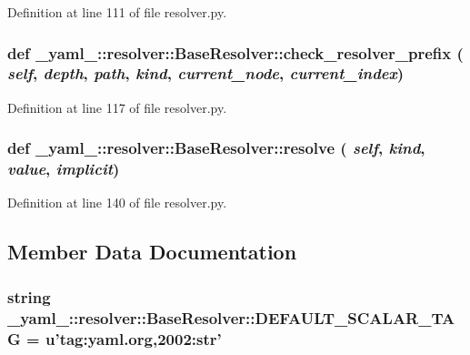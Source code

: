 Definition at line 111 of file resolver.py.
\subsubsection{\setlength{\rightskip}{0pt plus 5cm}def \_\-yaml\_\-::resolver::BaseResolver::check\_\-resolver\_\-prefix ( {\em self},  {\em depth},  {\em path},  {\em kind},  {\em current\_\-node},  {\em current\_\-index})}\label{class__yaml___1_1resolver_1_1BaseResolver_172b5f827c17f2f218bb8597e2a42b69}




Definition at line 117 of file resolver.py.
\subsubsection{\setlength{\rightskip}{0pt plus 5cm}def \_\-yaml\_\-::resolver::BaseResolver::resolve ( {\em self},  {\em kind},  {\em value},  {\em implicit})}\label{class__yaml___1_1resolver_1_1BaseResolver_04eb7f73756ad061643f7212c0fda319}




Definition at line 140 of file resolver.py.

\subsection{Member Data Documentation}
\subsubsection{\setlength{\rightskip}{0pt plus 5cm}string {\bf \_\-yaml\_\-::resolver::BaseResolver::DEFAULT\_\-SCALAR\_\-TAG} = u'tag:yaml.org,2002:str'\hspace{0.3cm}{\tt  [static]}}\label{class__yaml___1_1resolver_1_1BaseResolver_9ea914b8a38c1626ccd3224b32c81f9f}




